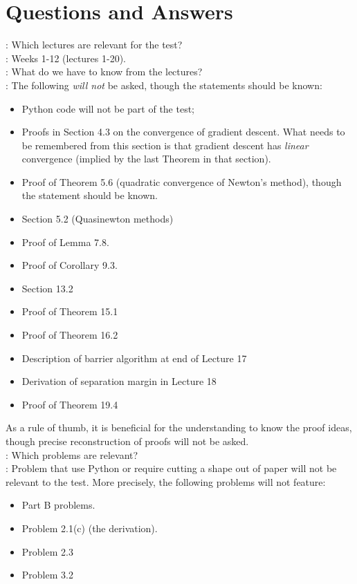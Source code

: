 \documentclass[11pt,a4paper]{memoir}
\begin{document}
\newpage

\section*{Questions and Answers}

: Which lectures are relevant for the test?\\

: Weeks 1-12 (lectures 1-20). \\

: What do we have to know from the lectures?\\

: The following {\em will not} be asked, though the statements should be known:
\begin{itemize}
\item Python code will not be part of the test;
\item Proofs in Section 4.3 on the convergence of gradient descent. What needs to be remembered from this section is that gradient descent has {\em linear} convergence (implied by the last Theorem in that section).
\item Proof of Theorem 5.6 (quadratic convergence of Newton's method), though the statement should be known.
\item Section 5.2 (Quasinewton methods)
\item Proof of Lemma 7.8.
\item Proof of Corollary 9.3.
\item Section 13.2
\item Proof of Theorem 15.1
\item Proof of Theorem 16.2
\item Description of barrier algorithm at end of Lecture 17
\item Derivation of separation margin in Lecture 18
\item Proof of Theorem 19.4
\end{itemize}

As a rule of thumb, it is beneficial for the understanding to know the proof ideas, though precise reconstruction of proofs will not be asked.\\

: Which problems are relevant?\\

: Problem that use Python or require cutting a shape out of paper will not be relevant to the test. More precisely, the following problems will not feature:

\begin{itemize}
\item Part B problems.
\item Problem 2.1(c) (the derivation).
\item Problem 2.3
\item Problem 3.2
\end{itemize}

%

%

%
%
\end{document}
